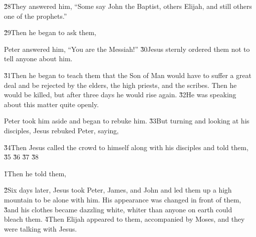 \v{28}They answered him, ``Some say John the Baptist, others Elijah, and still others one of the prophets.''

\v{29}Then he began to ask them, 

Peter answered him, ``You are the Messiah!'' \v{30}Jesus sternly ordered them not to tell anyone about him.

\v{31}Then he began to teach them that the Son of Man would have to suffer a great deal and be rejected by the elders, the high priests, and the scribes. Then he would be killed, but after three days he would rise again. \v{32}He was speaking about this matter quite openly.

Peter took him aside and began to rebuke him. \v{33}But turning and looking at his disciples, Jesus rebuked Peter, saying, 

\v{34}Then Jesus called the crowd to himself along with his disciples and told them,  \v{35} \v{36} \v{37} \v{38}

\v{1}Then he told them, 

\v{2}Six days later, Jesus took Peter, James, and John and led them up a high mountain to be alone with him. His appearance was changed in front of them, \v{3}and his clothes became dazzling white, whiter than anyone on earth could bleach them. \v{4}Then Elijah appeared to them, accompanied by Moses, and they were talking with Jesus.

